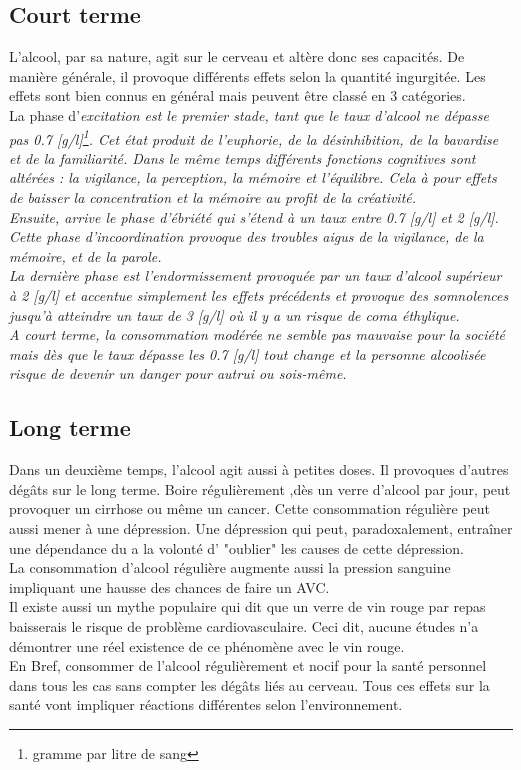 \documentclass[a4paper, french, 12pt]{extarticle}
\begin{document}
	\subsection{Court terme}
	L'alcool, par sa nature, agit sur le cerveau et altère donc ses capacités. De manière générale, il provoque différents effets selon la quantité ingurgitée. Les effets sont bien connus en général mais peuvent être classé en 3 catégories.\\
	La phase d'\em{}excitation\em{} est le premier stade, tant que le taux d'alcool ne dépasse pas 0.7 [g/l]\footnote{gramme par litre de sang}. Cet état produit de l'euphorie, de la désinhibition, de la bavardise et de la familiarité. Dans le même temps différents fonctions cognitives sont altérées : la vigilance, la perception, la mémoire et l'équilibre. Cela à pour effets de baisser la concentration et la mémoire au profit de la créativité.\\
	Ensuite, arrive le phase d'\em{}ébriété\em{} qui s'étend à un taux entre 0.7 [g/l] et 2 [g/l]. Cette phase d'incoordination provoque des troubles aigus de la vigilance, de la mémoire, et de la parole.\\
	La dernière phase est l'\em{}endormissement\em{} provoquée par un taux d'alcool supérieur à 2 [g/l] et accentue simplement les effets précédents et provoque des somnolences jusqu'à atteindre un taux de 3 [g/l] où il y a un risque de coma éthylique.\\ 
	A court terme, la consommation modérée ne semble pas mauvaise pour la société mais dès que le taux dépasse les 0.7 [g/l] tout change et la personne alcoolisée risque de devenir un danger pour autrui ou sois-même.
	\subsection{Long terme}
	Dans un deuxième temps, l'alcool agit aussi à petites doses. Il provoques d'autres dégâts sur le long terme.
	Boire régulièrement ,dès un verre d'alcool par jour, peut provoquer un cirrhose ou même un cancer. Cette consommation régulière peut aussi mener à une dépression. Une dépression qui peut, paradoxalement, entraîner une dépendance du a la volonté d' "oublier" les causes de cette dépression.\\
	La consommation d'alcool régulière augmente aussi la pression sanguine impliquant une hausse des chances de faire un AVC.\\
	Il existe aussi un mythe populaire qui dit que un verre de vin rouge par repas baisserais le risque de problème cardiovasculaire. Ceci dit, aucune études n'a démontrer une réel existence de ce phénomène avec le vin rouge.\\
	En Bref, consommer de l'alcool régulièrement et nocif pour la santé personnel dans tous les cas sans compter les dégâts liés au cerveau. Tous ces effets sur la santé vont impliquer réactions différentes selon l'environnement.
\end{document}
